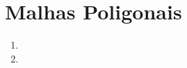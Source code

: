\section*{Malhas Poligonais}

	\begin{enumerate}\addtocounter{enumi}{7}
	
		\item 

		\item 
	
	\end{enumerate}